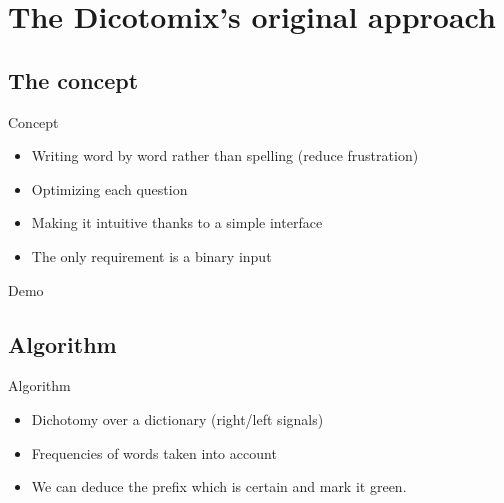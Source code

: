 \documentclass[graphics]{beamer}
\begin{document}
\section{The Dicotomix's original approach}
\subsection{The concept}

\begin{frame}{Concept}
	\begin{center}
		\begin{itemize}
			\item Writing word by word rather than spelling (reduce frustration)
			\item Optimizing each question
			\item Making it intuitive thanks to a simple interface
			\item The only requirement is a binary input
		\end{itemize}
	\end{center}
\end{frame}

\begin{frame}{Demo}
	\begin{center}
	\end{center}
\end{frame}

\subsection{Algorithm}

\begin{frame}{Algorithm}
	\begin{center}
		\begin{itemize}
			\item Dichotomy over a dictionary (right/left signals)
			\item Frequencies of words taken into account
			\item We can deduce the prefix which is certain and mark it green.
		\end{itemize}
	\end{center}
\end{frame}
\end{document}
